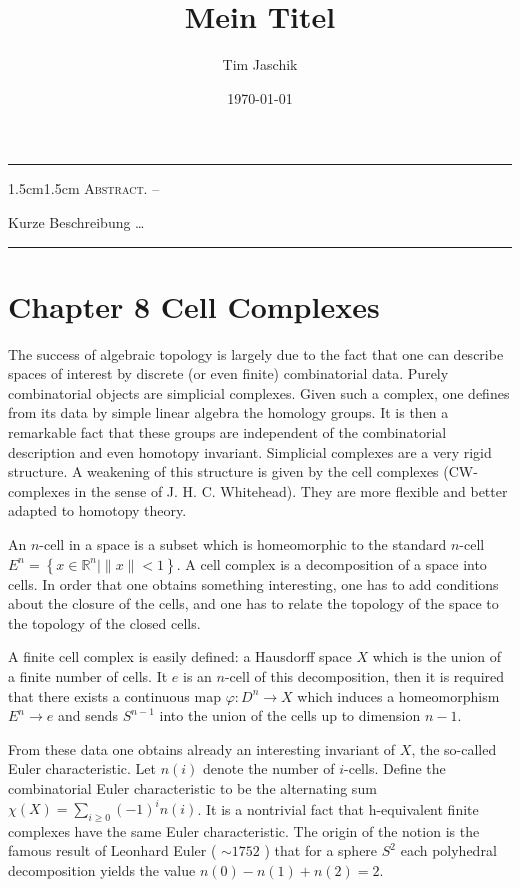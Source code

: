 \documentclass[10pt, letterpaper]{article}
\title{Mein Titel}
\author{Tim Jaschik}
\date{\today}
\renewenvironment{abstract}
  {
    \begin{adjustwidth}{1.5cm}{1.5cm}
    \small
    \textsc{Abstract. –}%
  }
  {
    \end{adjustwidth}
  }
\begin{document}
\maketitle
\rule{\textwidth}{0.5pt}
\begin{abstract}
Kurze Beschreibung …
\end{abstract}
\rule{\textwidth}{0.5pt}
\vspace{0.5cm}

\tableofcontents

\pagebreak


\section*{Chapter 8 Cell Complexes}
The success of algebraic topology is largely due to the fact that one can describe spaces of interest by discrete (or even finite) combinatorial data. Purely combinatorial objects are simplicial complexes. Given such a complex, one defines from its data by simple linear algebra the homology groups. It is then a remarkable fact that these groups are independent of the combinatorial description and even homotopy invariant. Simplicial complexes are a very rigid structure. A weakening of this structure is given by the cell complexes (CW-complexes in the sense of J. H. C. Whitehead). They are more flexible and better adapted to homotopy theory.

An $n$-cell in a space is a subset which is homeomorphic to the standard $n$-cell $E^{n}=\left\{x \in \mathbb{R}^{n} \mid\|x\|<1\right\}$. A cell complex is a decomposition of a space into cells. In order that one obtains something interesting, one has to add conditions about the closure of the cells, and one has to relate the topology of the space to the topology of the closed cells.

A finite cell complex is easily defined: a Hausdorff space $X$ which is the union of a finite number of cells. It $e$ is an $n$-cell of this decomposition, then it is required that there exists a continuous map $\varphi: D^{n} \rightarrow X$ which induces a homeomorphism $E^{n} \rightarrow e$ and sends $S^{n-1}$ into the union of the cells up to dimension $n-1$.

From these data one obtains already an interesting invariant of $X$, the so-called Euler characteristic. Let $n(i)$ denote the number of $i$-cells. Define the combinatorial Euler characteristic to be the alternating sum $\chi(X)=\sum_{i \geq 0}(-1)^{i} n(i)$. It is a nontrivial fact that h-equivalent finite complexes have the same Euler characteristic. The origin of the notion is the famous result of Leonhard Euler ( $\sim 1752$ ) that for a sphere $S^{2}$ each polyhedral decomposition yields the value $n(0)-n(1)+n(2)=2$.
\end{document}
